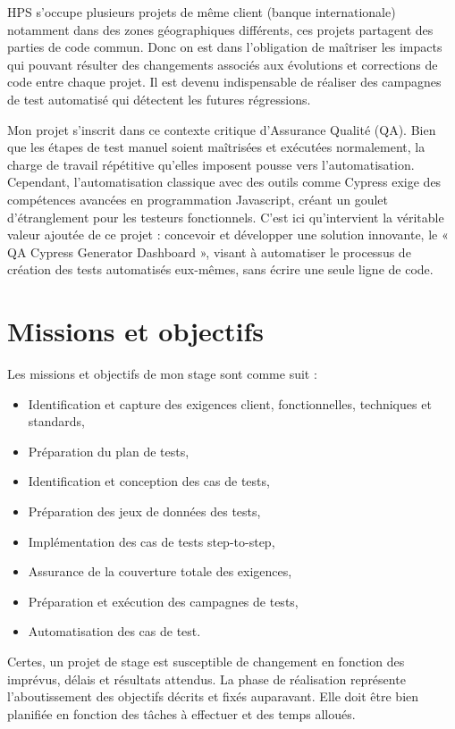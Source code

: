 HPS s'occupe plusieurs projets de même client (banque internationale) notamment dans des zones géographiques différents, ces projets partagent des parties de code commun. Donc on est dans l'obligation de maîtriser les impacts qui pouvant résulter des changements associés aux évolutions et corrections de code entre chaque projet. Il est devenu indispensable de réaliser des campagnes de test automatisé qui détectent les futures régressions.

Mon projet s'inscrit dans ce contexte critique d'Assurance Qualité (QA). Bien que les étapes de test manuel soient maîtrisées et exécutées normalement, la charge de travail répétitive qu'elles imposent pousse vers l'automatisation. Cependant, l'automatisation classique avec des outils comme Cypress exige des compétences avancées en programmation Javascript, créant un goulet d'étranglement pour les testeurs fonctionnels. C'est ici qu'intervient la véritable valeur ajoutée de ce projet : concevoir et développer une solution innovante, le « QA Cypress Generator Dashboard », visant à automatiser le processus de création des tests automatisés eux-mêmes, sans écrire une seule ligne de code.

\section{Missions et objectifs}

Les missions et objectifs de mon stage sont comme suit :

\begin{itemize}[leftmargin=*]
\item Identification et capture des exigences client, fonctionnelles, techniques et standards,
\item Préparation du plan de tests,
\item Identification et conception des cas de tests,
\item Préparation des jeux de données des tests,
\item Implémentation des cas de tests step-to-step,
\item Assurance de la couverture totale des exigences,
\item Préparation et exécution des campagnes de tests,
\item Automatisation des cas de test.
\end{itemize}

Certes, un projet de stage est susceptible de changement en fonction des imprévus, délais et résultats attendus. La phase de réalisation représente l'aboutissement des objectifs décrits et fixés auparavant. Elle doit être bien planifiée en fonction des tâches à effectuer et des temps alloués.

